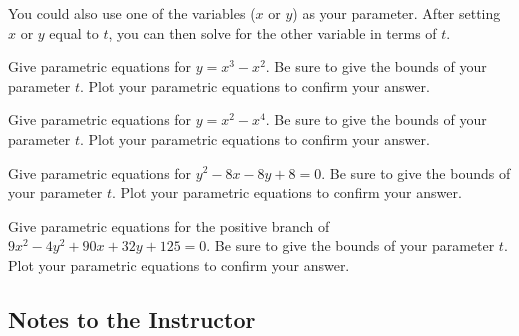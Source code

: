 You could also use one of the variables ($x$ or $y$) as your parameter. After setting $x$ or $y$ equal to $t$, you can then solve for the other variable in terms of $t$.

\question Give parametric equations for $y=x^3-x^2$. Be sure to give the bounds of your parameter $t$. Plot your parametric equations to confirm your answer.

\question Give parametric equations for $y=x^2-x^4$. Be sure to give the bounds of your parameter $t$. Plot your parametric equations to confirm your answer.

\question Give parametric equations for $y^2-8x-8y+8=0$. Be sure to give the bounds of your parameter $t$. Plot your parametric equations to confirm your answer.

\question Give parametric equations for the positive branch of $9x^2-4y^2+90x+32y+125=0$. Be sure to give the bounds of your parameter $t$. Plot your parametric equations to confirm your answer.

\backmatter

\begin{annotation}
\chapter{Notes to the Instructor}
\renewcommand\notesname{}
\vspace{-2cm}
\begingroup
\setlength{\parskip}{2ex}
\renewcommand{\enotesize}{\normalsize}
\theendnotes
\endgroup
\end{annotation}


